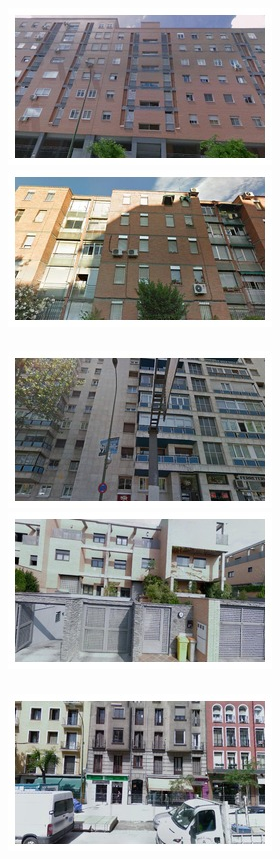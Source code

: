\begin{figure}
\begin{minipage}{\linewidth}
\begin{minipage}{0.3\linewidth}
      \includegraphics[width=0.49\linewidth]{imgs/vege/mosaicsT1/mosaic0020.jpg}
      \includegraphics[width=0.49\linewidth]{imgs/vege/mosaicsT1/mosaic0035.jpg}
      \\ \vspace{-3mm} \\
      \includegraphics[width=0.49\linewidth]{imgs/vege/mosaicsT1/mosaic0043.jpg}
      \includegraphics[width=0.49\linewidth]{imgs/vege/mosaicsT1/mosaic0047.jpg}
      \\ \vspace{-3mm} \\
      \includegraphics[width=0.49\linewidth]{imgs/vege/mosaicsT1/mosaic0079.jpg}

\end{minipage}
\end{minipage}
\end{figure}
